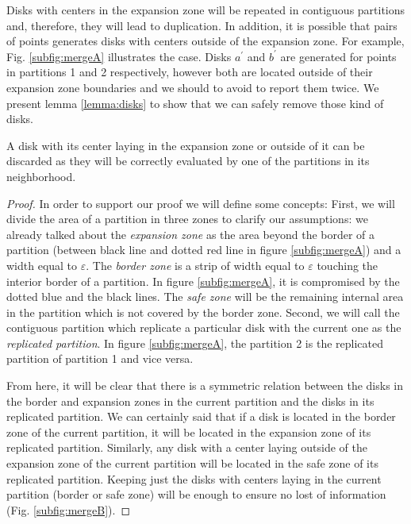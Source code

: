 \begin{itemize}
Disks with centers in the expansion zone will be repeated in contiguous partitions and, therefore, they will lead to duplication.  In addition, it is possible that pairs of points generates disks with centers outside of the expansion zone.  For example, Fig. \ref{subfig:mergeA} illustrates the case.  Disks $a^\prime$ and $b^\prime$ are generated for points in partitions 1 and 2 respectively, however both are located outside of their expansion zone boundaries and we should to avoid to report them twice.  We present lemma \ref{lemma:disks} to show that we can safely remove those kind of disks.

\begin{lemma}\label{lemma:disks}
A disk with its center laying in the expansion zone or outside of it can be discarded as they will be correctly evaluated by one of the partitions in its neighborhood. 
\end{lemma}

\begin{proof}
  In order to support our proof we will define some concepts:  First, we will divide the area of a partition in three zones to clarify our assumptions:  we already talked about the \textit{expansion zone} as the area beyond the border of a partition (between black line and dotted red line in figure \ref{subfig:mergeA}) and a width equal to $\varepsilon$.  The \textit{border zone} is a strip of width equal to $\varepsilon$ touching the interior border of a partition.  In figure \ref{subfig:mergeA}, it is compromised by the dotted blue and the black lines.  The \textit{safe zone} will be the remaining internal area in the partition which is not covered by the border zone.  Second, we will call the contiguous partition which replicate a particular disk with the current one as the \textit{replicated partition}. In figure \ref{subfig:mergeA}, the partition 2 is the replicated partition of partition 1 and vice versa.

  From here, it will be clear that there is a symmetric relation between the disks in the border and expansion zones in the current partition and the disks in its replicated partition.  We can certainly said that if a disk is located in the border zone of the current partition, it will be located in the expansion zone of its replicated partition.  Similarly, any disk with a center laying outside of the expansion zone of the current partition will be located in the safe zone of its replicated partition.  Keeping just the disks with centers laying in the current partition (border or safe zone) will be enough to ensure no lost of information (Fig. \ref{subfig:mergeB}).
\end{proof}


\end{itemize}

